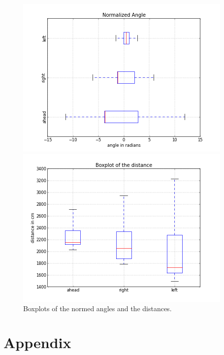 \documentclass{scrartcl}
\begin{document}
\begin{figure}[H]
\centering
\begin{minipage}{.5\textwidth}
  \centering
  \includegraphics[width=.8\linewidth]{img/BoxplotAngleNorm.png}
\end{minipage}%
\begin{minipage}{.5\textwidth}
  \centering
  \includegraphics[width=.8\linewidth]{img/BoxplotDistance.png}
\end{minipage}
\caption{Boxplots of the normed angles and the distances.}
\label{fig:right}
\end{figure}





\section{Appendix}


\end{document}
